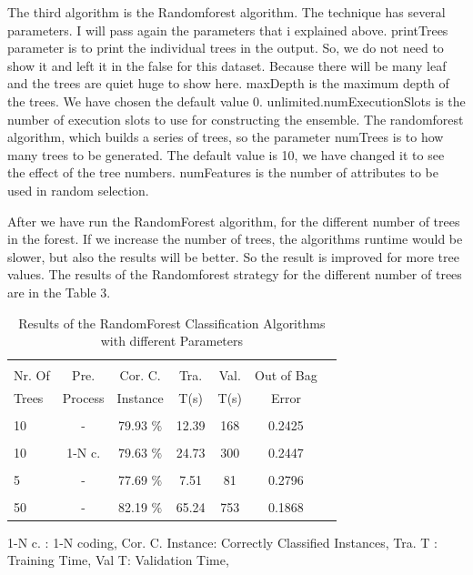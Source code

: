\documentclass[a4paper]{article}
\begin{document}
The third algorithm is the Randomforest algorithm. The technique has several parameters. I will pass again the parameters that i explained above. printTrees parameter is to print the individual trees in the output. So, we do not need to show it and left it in the false for this dataset. Because there will be many leaf and the trees are quiet huge to show here. maxDepth is the maximum depth of the trees. We have chosen the default value 0. unlimited.numExecutionSlots is the number of execution slots to use for constructing the ensemble. The randomforest algorithm, which builds a series of trees, so the parameter numTrees is to how many trees to be generated. The default value is 10, we have changed it to see the effect of the tree numbers. numFeatures is the number of attributes to be used in random selection. 

After we have run the RandomForest algorithm, for the different number of trees in the forest. If we increase the number of trees, the algorithms runtime would be slower, but also the results will be better. So the result is improved for more tree values. The results of the  Randomforest  strategy for the different number of trees are in the Table 3.


\begin{table}
\begin{tabular}{|l| c | c | c | c |c |c |}

\hline & & & & & \\
Nr. Of & Pre. & Cor. C.& Tra. & Val. & Out of Bag  \\
Trees & Process & Instance & T(s) &  T(s) & Error  \\
\hline & & & & & \\
10	 & - &			79.93  $\%$ & 12.39 & 168 & 0.2425  \\ 
\hline & & & & & \\
10 	 & 1-N c. &	79.63 $\%$ & 24.73 & 300 & 0.2447  \\ 
\hline & & & & & \\
5 	& - &			77.69 $\%$ & 7.51 & 81 & 0.2796   \\ 
\hline & & & & &  \\
50 	 & - &			82.19  $\%$ & 65.24 & 753 &  0.1868 \\ 
\hline
\end{tabular}
\caption{Results of the RandomForest Classification Algorithms with different Parameters}
	1-N c. : 1-N coding,
	Cor. C. Instance:  Correctly Classified Instances,
	Tra. T : Training Time,
	Val T: Validation Time,
\end{table}
\end{document}
